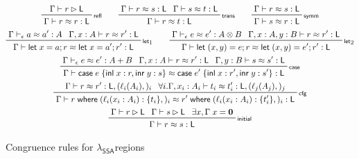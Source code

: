\documentclass[acmsmall,screen,review]{acmart}
\newcommand{\mb}[1]{\ensuremath{\mathbf{#1}}}
\newcommand{\ms}[1]{\ensuremath{\mathsf{#1}}}
\newcommand{\lto}{:}
\newcommand{\linl}[1]{\ms{inl}\;{#1}}
\newcommand{\linr}[1]{\ms{inr}\;{#1}}
\newcommand{\caseexpr}[5]{\ms{case}\;#1\;\{\linl{#2} \lto #3, \linr{#4} \lto #5\}}
\newcommand{\letstmt}[3]{\ensuremath{\ms{let}\;#1 = #2; #3}}
\newcommand{\where}[2]{#1\;\ms{where}\;#2}
\newcommand{\wbranch}[3]{#1(#2) \lto \{#3\}}
\newcommand{\bhyp}[2]{#1 : #2}
\newcommand{\lhyp}[2]{#1(#2)}
\newcommand{\rle}[1]{{\scriptsize\textsf{#1}}}
\newcommand{\haslb}[3]{#1 \vdash #2 \rhd #3}
\newcommand{\teqv}{\approx}
\newcommand{\tmeq}[5]{#1 \vdash_{#2} #3 \teqv #4 : {#5}}
\newcommand{\lbeq}[4]{#1 \vdash #2 \teqv #3 : {#4}}
\newcommand{\isotopessa}{\(\lambda_{\ms{SSA}}\)}
\begin{document}
\begin{figure}
  \begin{gather*}
    \prftree[r]{\rle{refl}}{\haslb{\Gamma}{r}{\ms{L}}}{\lbeq{\Gamma}{r}{r}{\ms{L}}} \qquad
    \prftree[r]{\rle{trans}}{\lbeq{\Gamma}{r}{s}{\ms{L}}}{\lbeq{\Gamma}{s}{t}{\ms{L}}}
      {\lbeq{\Gamma}{r}{t}{\ms{L}}} \qquad
    \prftree[r]{\rle{symm}}{\lbeq{\Gamma}{r}{s}{\ms{L}}}{\lbeq{\Gamma}{s}{r}{\ms{L}}}
    \\
    \prftree[r]{\rle{let}$_1$}
      {\tmeq{\Gamma}{\epsilon}{a}{a'}{A}}
      {\lbeq{\Gamma, \bhyp{x}{A}}{r}{r'}{\ms{L}}}
      {\lbeq{\Gamma}{\letstmt{x}{a}{r}}{\letstmt{x}{a'}{r'}}{\ms{L}}}
    \qquad
    \prftree[r]{\rle{let}$_2$}
      {\tmeq{\Gamma}{\epsilon}{e}{e'}{A \otimes B}}
      {\lbeq{\Gamma, \bhyp{x}{A}, \bhyp{y}{B}}{r}{r'}{\ms{L}}}
      {\lbeq{\Gamma}{\letstmt{(x, y)}{e}{r}}{\letstmt{(x, y)}{e'}{r'}}{\ms{L}}}
    \\
    \prftree[r]{\rle{case}}
      {\tmeq{\Gamma}{\epsilon}{e}{e'}{A + B}}
      {\lbeq{\Gamma, \bhyp{x}{A}}{r}{r'}{\ms{L}}}
      {\lbeq{\Gamma, \bhyp{y}{B}}{s}{s'}{\ms{L}}}
      {\lbeq{\Gamma}{\caseexpr{e}{x}{r}{y}{s}}{\caseexpr{e'}{x}{r'}{y}{s'}}{\ms{L}}}
    \\
    \prftree[r]{\rle{cfg}}
      {\lbeq{\Gamma}{r}{r'}{\ms{L}, (\lhyp{\ell_i}{A_i},)_i}}
      {\forall i. \lbeq{\Gamma, \bhyp{x_i}{A_i}}{t_i}{t_i'}{\ms{L}, (\lhyp{\ell_j}{A_j},)_j}}
      {\lbeq{\Gamma}
        {\where{r}{(\wbranch{\ell_i}{x_i: A_i}{t_i},)_i}}
        {\where{r'}{(\wbranch{\ell_i}{x_i: A_i}{t_i'},)_i}}
        {\ms{L}}
      }
    \\
    \prftree[r]{\rle{initial}}
      {\haslb{\Gamma}{r}{\ms{L}}}
      {\haslb{\Gamma}{s}{\ms{L}}}
      {\exists x, \Gamma\;x = \mb{0}}
      {\lbeq{\Gamma}{r}{s}{\ms{L}}}
  \end{gather*}
  \Description{}
  \caption{Congruence rules for \isotopessa regions}
  \label{fig:ssa-reg-congr-rules}
\end{figure}
\end{document}
